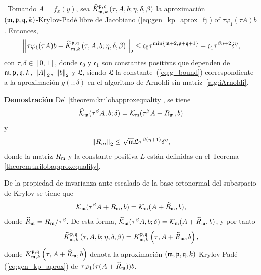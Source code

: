 \begin{theorem}\label{theorem:Krylov-fj-bound}
\cite{naranjo2023jacobian}~Tomando $A=f_x(y)$, sea $\widehat{K}_{\mathfrak{m},k}^{\mathfrak{p},\mathfrak{q}}\left(\tau, A , b ; \eta, \delta, \beta \right)$ la aproximación \\
	$(\mathfrak{m} , \mathfrak{p} ,\mathfrak{q} , k)$-Krylov-Padé libre de Jacobiano (\ref{eq:gen_kp_aprox_fj}) of $\tau \varphi_1(\tau A)b$. Entonces,
	\begin{equation}
		\left\lvert\left\lvert  \tau \varphi_1(\tau A)b -
		\widehat{K}_{\mf,k}^{\pf,\qf}\left( \tau, A , b ; \eta, \delta, \beta \right)\right\rvert\right\rvert_2%
		\leq \mathfrak{c}_0 \tau^{\min\{\mf+2,\pf+\qf+1\}} + \mathfrak{c}_1 \tau^{\beta\eta+2}\delta^{\eta},
	\end{equation}
	con $\tau,\delta \in [0,1]$, donde $\mathfrak{c}_0$ y $\mathfrak{c}_1$ son constantes positivas que dependen de $\mathfrak{m},\mathfrak{p},\mathfrak{q},k$, $\left\lVert A \right\rVert_2$, $\left\lVert b \right\rVert_2$ y $\mathfrak{L}$, siendo $\mathfrak{L}$ la constante~(\ref{eq:g_bound}) correspondiente a la aproximación $g(.;\delta)$ en el algoritmo de Arnoldi sin matriz~\ref{alg:iArnoldi}.
\end{theorem}
\textbf{Demostración} Del \ref{theorem:krilobapproxequality}, se tiene
\[ \widehat{\mathcal{K}}_{\mathfrak{m}}(\tau^\beta A,b;\delta)=\mathcal{K}_{\mathfrak{m}}(\tau^\beta A+R_{\mathfrak{m}},b) \]
y
\begin{equation}
	\left\lVert R_m \right\rVert_2\leq \sqrt{\mathfrak{m}} \mathfrak{L} \tau^{\beta(\eta+1)}\delta^{\eta},  \label{eq:fjbound3}
\end{equation}
donde la matriz $R_{\mathfrak{m}}$ y la constante positiva $L$ están definidas en el Teorema \ref{theorem:krilobapproxequality}. 

De la propiedad de invarianza ante escalado de la base ortonormal del subespacio de Krylov se tiene que
\[ \mathcal{K}_{\mathfrak{m}}(\tau^\beta A+R_{\mathfrak{m}},b) = \mathcal{K}_{\mathfrak{m}}(A+\widehat{R}_{\mathfrak{m}},b), \]
donde $\widehat{R}_{\mathfrak{m}} = R_{\mathfrak{m}}/\tau^\beta$. De esta forma, $\widehat{\mathcal{K}}_{\mathfrak{m}}(\tau^\beta A,b;\delta)=\mathcal{K}_{\mathfrak{m}}(A+\widehat{R}_{\mathfrak{m}},b)$, y por tanto
\begin{equation}
	\widehat{K}_{\mathfrak{m},k}^{\mathfrak{p},\mathfrak{q}}\left( \tau, A , b; \eta, \delta, \beta \right) = K_{\mathfrak{m},k}^{\mathfrak{p},\mathfrak{q}}\left( \tau, A+\widehat{R}_{\mathfrak{m}} , b \right), \label{identidad}
\end{equation}
donde $K_{\mathfrak{m},k}^{\mathfrak{p},\mathfrak{q}}\left( \tau, A+\widehat{R}_{\mathfrak{m}} , b \right)$ denota la aproximación $(\mathfrak{m} , \mathfrak{p} ,\mathfrak{q} , k)$-Krylov-Padé (\ref{eq:gen_kp_aprox}) de $\tau \varphi_1(\tau (A+\widehat{R}_{\mathfrak{m}}))b$. 

